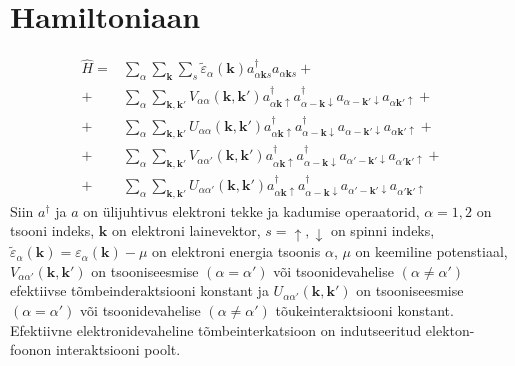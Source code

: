 \documentclass[class=article, crop=false]{standalone}
\begin{document}
\tableofcontents
\newpage	
\section{Hamiltoniaan}
\begin{equation} \label{eff}
	\begin{split}
		\hat{H} = & \sum_{ \alpha} \sum_{ \mathbf{k}} \sum_{s} \tilde{ \varepsilon}_{ \alpha} ( \mathbf{k}) a^{ \dagger}_{ \alpha \mathbf{k} s} a_{ \alpha \mathbf{k} s} + \\
		+ & \sum_{ \alpha} \sum_{ \mathbf{k}, \mathbf{k}'} V_{ \alpha \alpha} ( \mathbf{k}, \mathbf{k}') a^{ \dagger}_{ \alpha \mathbf{k} \uparrow} a^{ \dagger}_{ \alpha -\mathbf{k} \downarrow} a_{ \alpha -\mathbf{k}' \downarrow} a_{ \alpha \mathbf{k}' \uparrow} + \\
		+ & \sum_{ \alpha} \sum_{ \mathbf{k}, \mathbf{k}'} U_{ \alpha \alpha} ( \mathbf{k}, \mathbf{k}') a^{ \dagger}_{ \alpha \mathbf{k} \uparrow} a^{ \dagger}_{ \alpha -\mathbf{k} \downarrow} a_{ \alpha -\mathbf{k}' \downarrow} a_{ \alpha \mathbf{k}' \uparrow} + \\
		+ & \sum_{ \alpha} \sum_{ \mathbf{k}, \mathbf{k}'} V_{ \alpha \alpha'} ( \mathbf{k}, \mathbf{k}') a^{ \dagger}_{ \alpha \mathbf{k} \uparrow} a^{ \dagger}_{ \alpha -\mathbf{k} \downarrow} a_{ \alpha' -\mathbf{k}' \downarrow} a_{ \alpha' \mathbf{k}' \uparrow} + \\
		+ & \sum_{ \alpha} \sum_{ \mathbf{k}, \mathbf{k}'} U_{ \alpha \alpha'} ( \mathbf{k}, \mathbf{k}') a^{ \dagger}_{ \alpha \mathbf{k} \uparrow} a^{ \dagger}_{ \alpha -\mathbf{k} \downarrow} a_{ \alpha' -\mathbf{k}' \downarrow} a_{ \alpha' \mathbf{k}' \uparrow}
	\end{split}
\end{equation}
Siin $ a^{ \dagger}$ ja $a$ on ülijuhtivus elektroni tekke ja kadumise operaatorid, $ \alpha = 1,2$ on tsooni indeks, $ \mathbf{k}$ on elektroni lainevektor, $ s = \uparrow, \downarrow$ on spinni indeks, $ \tilde{ \varepsilon}_{ \alpha} ( \mathbf{k}) = \varepsilon_{ \alpha} ( \mathbf{k}) - \mu$ on elektroni energia tsoonis $ \alpha$, $ \mu$ on keemiline potenstiaal, $ V_{ \alpha \alpha'} ( \mathbf{k}, \mathbf{k}')$ on tsooniseesmise $ ( \alpha = \alpha')$ või tsoonidevahelise $ ( \alpha \neq \alpha') $ efektiivse tõmbeinderaktsiooni konstant ja $ U_{ \alpha \alpha'} ( \mathbf{k}, \mathbf{k}')$ on tsooniseesmise $ ( \alpha = \alpha')$ või tsoonidevahelise $ ( \alpha \neq \alpha')$ tõukeinteraktsiooni konstant. Efektiivne elektronidevaheline tõmbeinterkatsioon on indutseeritud elekton-foonon interaktsiooni poolt.
\end{document}
